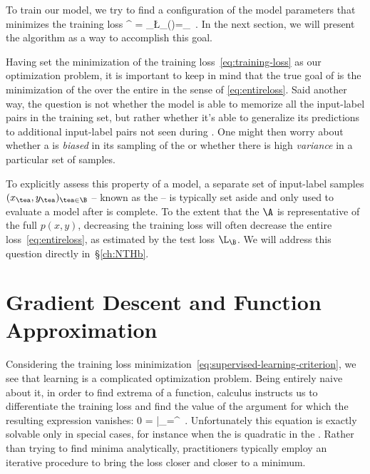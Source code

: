 To train our model, we try to find a configuration of the model parameters that minimizes the training loss 
\be\label{eq:supervised-learning-criterion}
\theta^{\star} = \argmin_\theta \L_\A(\theta)=\argmin_\theta {}\, .
\ee
In the next section, 
we will present the  algorithm as a way to accomplish this goal.

Having set the minimization of the training loss~\eqref{eq:training-loss} as our optimization problem, it is important to keep in mind that the true goal of  is the minimization of the  over the entire  in the sense of \eqref{eq:entireloss}.
Said another way, the question is not whether the model is able to memorize all the input-label pairs in the training set, but rather whether it's able to generalize its predictions to additional input-label pairs not seen during .
One might then worry about whether a  is \emph{biased} in its sampling of the  or
whether
there is high \emph{variance} in a particular set of samples.

To explicitly assess this  property of a model, a separate set of input-label samples $(x_{\tea}, y_{\tea})_{\tea \in \B}$ -- known as the  -- is typically set aside and only used to evaluate a model after  is complete.  To the extent that the  $\A$ is representative of the full  $p(x,y)$, 
decreasing the training loss will often decrease the entire loss~\eqref{eq:entireloss}, as estimated by the test loss $\L_\B$. We will address this question directly in~\S\ref{ch:NTHb}.










\section{Gradient Descent and Function Approximation}\label{sec:gd}
Considering the training loss minimization~\eqref{eq:supervised-learning-criterion}, we see that learning is a complicated optimization problem.
Being entirely naive about it,  in order to find extrema of a function, calculus instructs us to differentiate the training loss and find the value of the argument for which the resulting expression vanishes:
\be\label{eq:gradient-vanishing-mind}
0 = \frac{\td\L_\A}{\td\theta_{\mu}}\Bigg|_{\theta=\theta^{\star}}\, .
\ee
Unfortunately this equation is exactly solvable only in special cases, for instance when the  is quadratic in the . Rather than trying to find minima analytically, practitioners typically employ an iterative procedure to bring the loss closer and closer to a minimum.  



